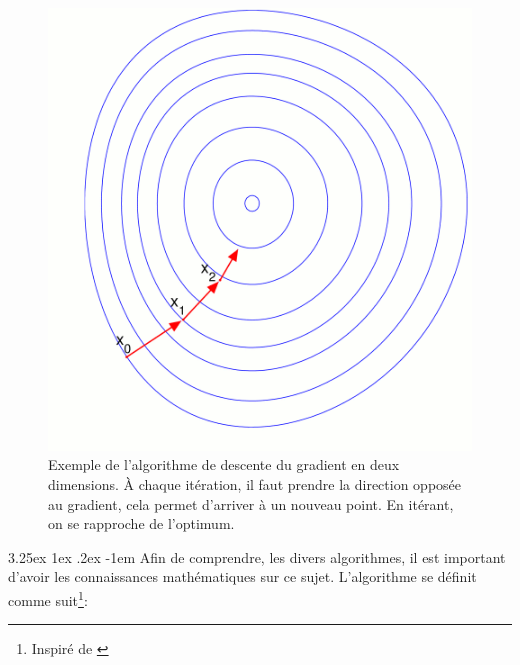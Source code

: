 \documentclass[a4paper, 11pt]{article}
\makeatletter
\renewcommand\paragraph{\@startsection{paragraph}{5}{\z@}%
  {3.25ex \@plus1ex \@minus.2ex}%
  {-1em}%
  {\normalfont\normalsize\bfseries}}
\makeatother
\begin{document}
\begin{figure}[H]
\centering
\includegraphics[scale=0.40]{images/descente_gradient_exemple}
\caption[]{Exemple de l'algorithme de descente du gradient en deux dimensions. À chaque itération,
il faut prendre la direction opposée au gradient\footnotemark, cela permet d'arriver à un nouveau
point. En itérant, on se rapproche de l'optimum. }
\end{figure}


\paragraph{}
Afin de comprendre, les divers algorithmes, il est important d'avoir les connaissances mathématiques
sur ce sujet. L'algorithme se définit comme suit\footnote{Inspiré de \cite{wikipedia_descente_du_gradient}}:
\end{document}
